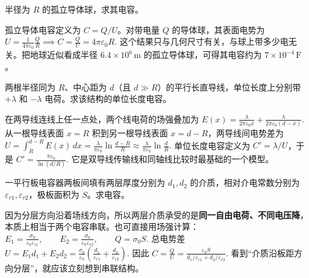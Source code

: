 \documentclass[lang=cn,11pt]{elegantbook}
\begin{document}
\begin{exercise}[球形孤立导体的电容]
半径为 \(R\) 的孤立导体球，求其电容。
\end{exercise}

\begin{solution}
孤立导体电容定义为 \(C=Q/U\)。对带电量 \(Q\) 的导体球，其表面电势为
 \(U=\frac{1}{4\pi\varepsilon_0}\frac{Q}{R} \implies C=\frac{Q}{U}=4\pi\varepsilon_0R.\) 
这个结果只与几何尺寸有关，与球上带多少电无关。把地球近似看成半径 \(6.4\times 10^6\,\mathrm{m}\) 的孤立导体球，可得其电容约为 \(7\times 10^{-4}\,\mathrm{F}\)。
\end{solution}

\begin{exercise}[两根平行长直导线的单位长度电容]
两根半径同为 \(R\)、中心距为 \(d\)（且 \(d\gg R\)）的平行长直导线，单位长度上分别带 \(+\lambda\) 和 \(-\lambda\) 电荷。求该结构的单位长度电容。
\end{exercise}

\begin{solution}
在两导线连线上任一点处，两个线电荷的场强叠加为
 \(E(x)=\frac{\lambda}{2\pi\varepsilon_0 x} +\frac{\lambda}{2\pi\varepsilon_0(d-x)}.\) 
从一根导线表面 \(x=R\) 积到另一根导线表面 \(x=d-R\)，两导线间电势差为
 \(U=\int_R^{d-R}E(x)\,dx =\frac{\lambda}{\pi\varepsilon_0}\ln\frac{d-R}{R} \approx \frac{\lambda}{\pi\varepsilon_0}\ln\frac{d}{R}.\) 
单位长度电容定义为 \(C'=\lambda/U\)，于是
 \(\boxed{ C'=\frac{\pi\varepsilon_0}{\ln(d/R)} }.\) 
它是双导线传输线和同轴线比较时最基础的一个模型。
\end{solution}

\begin{exercise}[沿场方向分层的平行板电容器]
一平行板电容器两板间填有两层厚度分别为 \(d_1,d_2\) 的介质，相对介电常数分别为 \(\varepsilon_{r1},\varepsilon_{r2}\)，极板面积为 \(S\)。求电容。
\end{exercise}

\begin{solution}
因为分层方向沿着场线方向，所以两层介质承受的是\textbf{同一自由电荷、不同电压降}，本质上相当于两个电容串联。也可直接用场强计算：
 \(E_1=\frac{\sigma_0}{\varepsilon_0\varepsilon_{r1}}, \qquad E_2=\frac{\sigma_0}{\varepsilon_0\varepsilon_{r2}}, \qquad Q=\sigma_0S.\) 
总电势差
 \(U=E_1d_1+E_2d_2 =\frac{\sigma_0}{\varepsilon_0}\left(\frac{d_1}{\varepsilon_{r1}}+\frac{d_2}{\varepsilon_{r2}}\right).\) 
因此
 \(\boxed{ C=\frac{Q}{U} =\frac{\varepsilon_0S}{d_1/\varepsilon_{r1}+d_2/\varepsilon_{r2}} }.\) 
看到“介质沿板距方向分层”，就应该立刻想到串联结构。
\end{solution}
\end{document}

